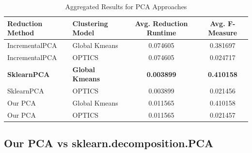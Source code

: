 \begin{table}[ht]
    \centering
    \caption{Aggregated Results for PCA Approaches}
    \begin{tabular}{l|l|c|c}
    \hline
    \textbf{Reduction Method} & \textbf{Clustering Model} & \textbf{Avg. Reduction Runtime} & \textbf{Avg. F-Measure} \\ \hline
    IncrementalPCA & Global Kmeans & 0.074605 & 0.381697 \\ 
    IncrementalPCA & OPTICS         & 0.074605 & 0.024717 \\ 
    
    \textbf{SklearnPCA}     & \textbf{Global Kmeans} & \textbf{0.003899} & \textbf{0.410158} \\ 
    SklearnPCA     & OPTICS         & 0.003899 & 0.021456 \\ 
    
    Our PCA              & Global Kmeans & 0.011565 & 0.410158 \\ 
    Our PCA           & OPTICS         & 0.011565 & 0.021457 \\ \hline
    \end{tabular}
    \label{tab:aggregated_results}
    \end{table}
    


\subsection{Our PCA vs sklearn.decomposition.PCA}
\label{subsec:pca-vs-scikit-pca}



